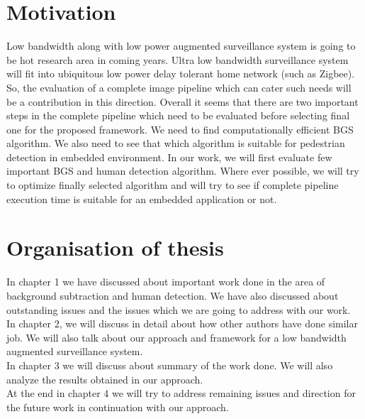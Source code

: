\pagebreak

\section{Motivation}
\indent Low bandwidth along with low power augmented surveillance system
is going to be hot research area in coming years. Ultra low bandwidth
surveillance system will fit into ubiquitous low power delay tolerant
home network (such as Zigbee). So, the evaluation of a complete image
pipeline which can cater such needs will be a contribution in this
direction. Overall it seems that there are two important steps in the
complete pipeline which need to be evaluated before selecting final one
for the proposed framework. We need to find computationally efficient
BGS algorithm. We also need to see that which algorithm is suitable for
pedestrian detection in embedded environment.  In our work, we will
first evaluate few important BGS and human detection algorithm.  Where
ever possible, we will try to optimize finally selected algorithm and
will try to see if complete pipeline execution time is suitable for an
embedded application or not.\\

\pagebreak

\section{Organisation of thesis}

\indent In chapter 1 we have discussed about important work done in the
area of background subtraction and human detection. We have also
discussed about outstanding issues and the issues which we are going to
address with our work.\\

\indent In chapter 2, we will discuss in detail about how other authors
have done similar job. We will also talk about our approach and
framework for a low bandwidth augmented surveillance system.\\

\indent In chapter 3 we will discuss about summary of the work done. We
will also analyze the results obtained in our approach.\\

\indent At the end in chapter 4 we will try to address remaining issues
and direction for the future work in continuation with our approach.\\


